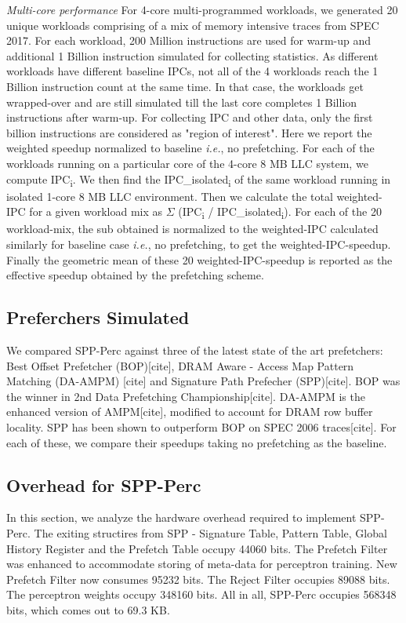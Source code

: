 \documentclass{sig-alternate}
\begin{document}
\textit{Multi-core performance} For 4-core multi-programmed workloads, we generated 20 unique workloads comprising of a mix of memory intensive traces from SPEC 2017. 
For each workload, 200 Million instructions are used for warm-up and additional 1 Billion instruction simulated for collecting statistics. 
As different workloads have different baseline IPCs, not all of the 4 workloads reach the 1 Billion instruction count at the same time. 
In that case, the workloads get wrapped-over and are still simulated till the last core completes 1 Billion instructions after warm-up. 
For collecting IPC and other data, only the first billion instructions are considered as "region of interest". 
Here we report the weighted speedup normalized to baseline \textit{i.e.}, no prefetching. 
For each of the workloads running on a particular core of the 4-core 8 MB LLC system, we compute IPC\textsubscript{i}. 
We then find the IPC\_isolated\textsubscript{i} of the same workload running in isolated 1-core 8 MB LLC environment. 
Then we calculate the total weighted-IPC for a given workload mix as $\Sigma$ (IPC\textsubscript{i} / IPC\_isolated\textsubscript{i}). 
For each of the 20 workload-mix, the sub obtained is normalized to the weighted-IPC calculated similarly for baseline case \textit{i.e.}, no prefetching, to get the weighted-IPC-speedup. 
Finally the geometric mean of these 20 weighted-IPC-speedup is reported as the effective speedup obtained by the prefetching scheme.

\subsection{Preferchers Simulated}
We compared SPP-Perc against three of the latest state of the art prefetchers: Best Offset Prefetcher (BOP)[cite], DRAM Aware - Access Map Pattern Matching (DA-AMPM) [cite] and Signature Path Prefecher (SPP)[cite]. 
BOP was the winner in 2nd Data Prefetching Championship[cite]. 
DA-AMPM is the enhanced version of AMPM[cite], modified to account for DRAM row buffer locality. 
SPP has been shown to outperform BOP on SPEC 2006 traces[cite]. 
For each of these, we compare their speedups taking no prefetching as the baseline.


\subsection{Overhead for SPP-Perc}
In this section, we analyze the hardware overhead required to implement SPP-Perc. 
The exiting structires from SPP - Signature Table, Pattern Table, Global History Register and the Prefetch Table occupy 44060 bits. 
The Prefetch Filter was enhanced to accommodate storing of meta-data for perceptron training. 
New Prefetch Filter now consumes 95232 bits. 
The Reject Filter occupies 89088 bits. 
The perceptron weights occupy 348160 bits. 
All in all, SPP-Perc occupies 568348 bits, which comes out to 69.3 KB. 
\end{document}
